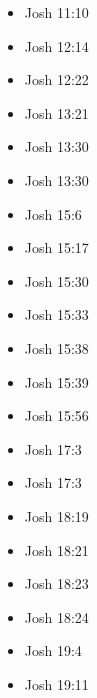 \documentclass[14pt]{book}
\begin{document}
\begin{multicols}{2}
\begin{itemize}
			\item Josh 11:10
			
			\item Josh 12:14
			
			\item Josh 12:22
			
			\item Josh 13:21
			
			\item Josh 13:30
			
			\item Josh 13:30
			
			\item Josh 15:6
			
			\item Josh 15:17
			
			\item Josh 15:30
			
			\item Josh 15:33
			
			\item Josh 15:38
			
			\item Josh 15:39
			
			\item Josh 15:56
			
			\item Josh 17:3
			
			\item Josh 17:3
			
			\item Josh 18:19
			
			\item Josh 18:21
			
			\item Josh 18:23
			
			\item Josh 18:24
			
			\item Josh 19:4
			
			\item Josh 19:11
			

\end{itemize}
\end{multicols}
\end{document}
